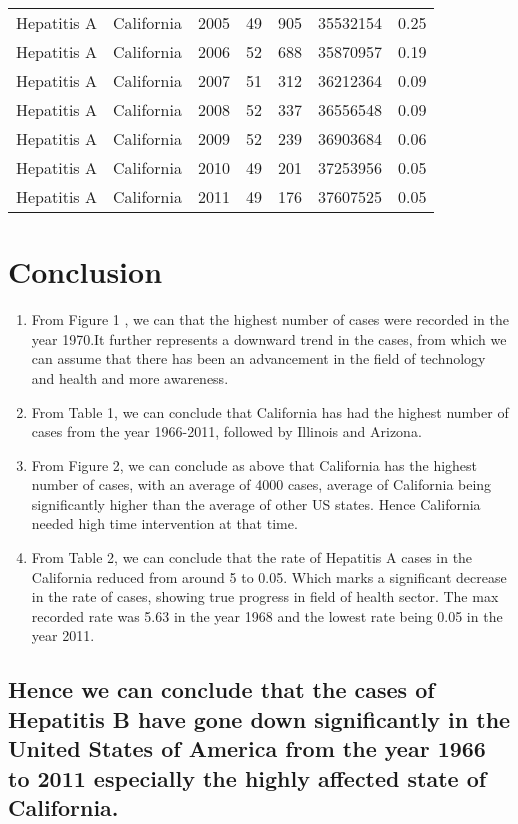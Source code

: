 \documentclass[
]{article}
\providecommand{\tightlist}{%
  \setlength{\itemsep}{0pt}\setlength{\parskip}{0pt}}
\begin{document}
\begin{longtable}[]{@{}llrrrrr@{}}
Hepatitis A & California & 2005 & 49 & 905 & 35532154 & 0.25 \\
Hepatitis A & California & 2006 & 52 & 688 & 35870957 & 0.19 \\
Hepatitis A & California & 2007 & 51 & 312 & 36212364 & 0.09 \\
Hepatitis A & California & 2008 & 52 & 337 & 36556548 & 0.09 \\
Hepatitis A & California & 2009 & 52 & 239 & 36903684 & 0.06 \\
Hepatitis A & California & 2010 & 49 & 201 & 37253956 & 0.05 \\
Hepatitis A & California & 2011 & 49 & 176 & 37607525 & 0.05 \\
\bottomrule
\end{longtable}

\hypertarget{conclusion}{%
\section{Conclusion}\label{conclusion}}

\begin{enumerate}
\def\labelenumi{\arabic{enumi}.}
\tightlist
\item
  From Figure 1 , we can that the highest number of cases were recorded
  in the year 1970.It further represents a downward trend in the cases,
  from which we can assume that there has been an advancement in the
  field of technology and health and more awareness.
\item
  From Table 1, we can conclude that California has had the highest
  number of cases from the year 1966-2011, followed by Illinois and
  Arizona.
\item
  From Figure 2, we can conclude as above that California has the
  highest number of cases, with an average of 4000 cases, average of
  California being significantly higher than the average of other US
  states. Hence California needed high time intervention at that time.
\item
  From Table 2, we can conclude that the rate of Hepatitis A cases in
  the California reduced from around 5 to 0.05. Which marks a
  significant decrease in the rate of cases, showing true progress in
  field of health sector. The max recorded rate was 5.63 in the year
  1968 and the lowest rate being 0.05 in the year 2011.
\end{enumerate}

\hypertarget{hence-we-can-conclude-that-the-cases-of-hepatitis-b-have-gone-down-significantly-in-the-united-states-of-america-from-the-year-1966-to-2011-especially-the-highly-affected-state-of-california.}{%
\subsection{Hence we can conclude that the cases of Hepatitis B have
gone down significantly in the United States of America from the year
1966 to 2011 especially the highly affected state of
California.}\label{hence-we-can-conclude-that-the-cases-of-hepatitis-b-have-gone-down-significantly-in-the-united-states-of-america-from-the-year-1966-to-2011-especially-the-highly-affected-state-of-california.}}
\end{document}

